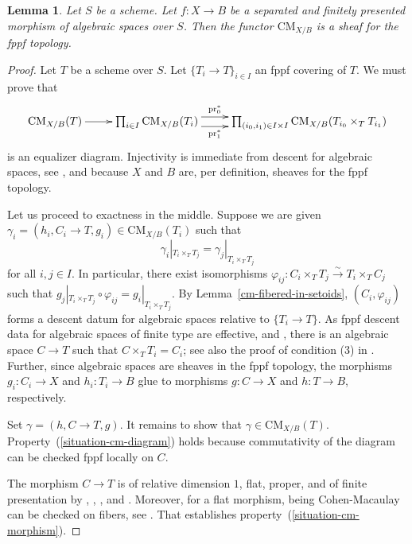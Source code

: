\documentclass{stacks-project}
\theoremstyle{plain}
\newtheorem{lemma}[subsection]{Lemma}
\theoremstyle{definition}
\theoremstyle{remark}
\numberwithin{equation}{subsection}
\def\CMfunctor{\mathcal{C}\!{\it oh}}
\def\CMfunctor{\text{CM}}
\begin{document}
\begin{lemma}
Let $S$ be a scheme.
Let $f \colon X \to B$ be a separated and finitely presented morphism of algebraic spaces over $S$.
Then the functor $\CMfunctor_{X/B}$ is a sheaf for the fppf topology.
\end{lemma}
\begin{proof}
Let $T$ be a scheme over $S$.
Let $\{ T_i \to T \}_{i \in I}$ an fppf covering of $T$.
We must prove that
\[ \xymatrix{
  \CMfunctor_{X/B}(T) \ar[r] & \prod\nolimits_{i\in I} \CMfunctor_{X/B}(T_i) \ar@<1ex>[r]^-{\text{pr}_0^*} \ar@<-1ex>[r]_-{\text{pr}_1^*} & \prod\nolimits_{(i_0, i_1) \in I \times I} \CMfunctor_{X/B}(T_{i_0} \times_T T_{i_1})
} \]
is an equalizer diagram.
Injectivity is immediate from descent for algebraic spaces, see \cite[Tag 0ADT]{stacks-project}, and because $X$ and $B$ are, per definition, sheaves for the fppf topology.

Let us proceed to exactness in the middle.
Suppose we are given $\gamma_i = (h_i,C_i \to T,g_i) \in \CMfunctor_{X/B}(T_i)$ such that 
\[ \gamma_i|_{T_i \times_T T_j} = \gamma_j|_{T_i \times_T T_j} \]
for all $i,j \in I$.
In particular, there exist isomorphisms $\varphi_{ij} \colon C_i \times_T T_j \xrightarrow{\sim} T_i \times_T C_j$ such that $g_j|_{T_i \times_T T_j} \circ \varphi_{ij} = g_i|_{T_i \times_T T_j}$.
By Lemma~\ref{cm-fibered-in-setoids}, $(C_i,\varphi_{ij})$ forms a descent datum for algebraic spaces relative to $\{T_i \to T\}$.
As fppf descent data for algebraic spaces of finite type are effective, \cite[Tag 04TR]{stacks-project} and \cite[Tag 04U0]{stacks-project}, there is an algebraic space $C \to T$ such that $C \times_T T_i = C_i$; see also the proof of condition (3) in \cite[Tag 0D1G]{stacks-project}.
Further, since algebraic spaces are sheaves in the fppf topology, the morphisms $g_i \colon C_i \to X$ and $h_i \colon T_i \to B$ glue to morphisms $g \colon C \to X$ and $h \colon T \to B$, respectively.

Set $\gamma = (h,C\to T,g)$.
It remains to show that $\gamma \in \CMfunctor_{X/B}(T)$.
Property~(\ref{situation-cm-diagram}) holds because commutativity of the diagram can be checked fppf locally on $C$.

The morphism $C \to T$ is of relative dimension $1$, flat, proper, and of finite presentation by \cite[Tag 02VJ]{stacks-project}, \cite[Tag 02L2]{stacks-project}, \cite[Tag 02L1]{stacks-project}, and \cite[Tag 02L0]{stacks-project}.
Moreover, for a flat morphism, being Cohen-Macaulay can be checked on fibers, see \cite[Tag 0E0W]{stacks-project}. That establishes property~(\ref{situation-cm-morphism}).


\end{proof}
\end{document}
